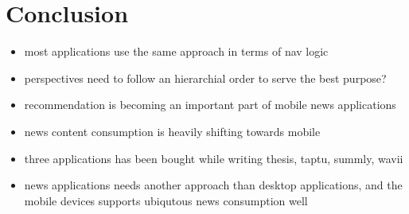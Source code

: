 \chapter{Conclusion}
\label{chapter_conclusion}

\begin{itemize}
	\item most applications use the same approach in terms of nav logic
	\item perspectives need to follow an hierarchial order to serve the best purpose?
	\item recommendation is becoming an important part of mobile news applications
	\item news content consumption is heavily shifting towards mobile
	\item three applications has been bought while writing thesis, taptu, summly, wavii
	\item news applications needs another approach than desktop applications, and the mobile devices supports ubiqutous news consumption well
\end{itemize}